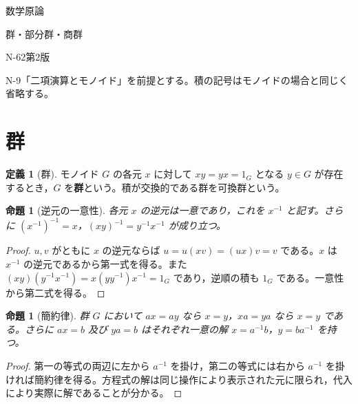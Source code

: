 \documentclass[a5paper,10pt,dvipdfmx]{jsarticle}
\theoremstyle{definition}
\newtheorem{defn}[ruledef]{定義}
\theoremstyle{plain}
\newtheorem{prop}[ruledef]{命題}
\begin{document}
\begin{center}
{\small 数学原論}\par\vspace{4mm}
{\LARGE 群・部分群・商群}\par\vspace{2mm}
{\small N-62\quad 第2版}
\end{center}
N-9「二項演算とモノイド」を前提とする。積の記号はモノイドの場合と同じく省略する。
\section{群}
\begin{defn}[群]\label{k225}
モノイド $G$ の各元 $x$ に対して $xy=yx=1_G$ となる $y\in G$ が存在するとき，$G$ を\textbf{群}という。積が交換的である群を可換群という。
\end{defn}
\begin{prop}[逆元の一意性]\label{k226}
各元 $x$ の逆元は一意であり，これを $x^{-1}$ と記す。さらに $(x^{-1})^{-1}=x$，$(xy)^{-1}=y^{-1}x^{-1}$ が成り立つ。
\end{prop}
\begin{proof}
$u,v$ がともに $x$ の逆元ならば $u=u(xv)=(ux)v=v$ である。$x$ は $x^{-1}$ の逆元であるから第一式を得る。また $(xy)(y^{-1}x^{-1})=x(yy^{-1})x^{-1}=1_G$ であり，逆順の積も $1_G$ である。一意性から第二式を得る。
\end{proof}
\begin{prop}[簡約律]\label{k227}
群 $G$ において $ax=ay$ なら $x=y$，$xa=ya$ なら $x=y$ である。さらに $ax=b$ 及び $ya=b$ はそれぞれ一意の解 $x=a^{-1}b$，$y=ba^{-1}$ を持つ。
\end{prop}
\begin{proof}
第一の等式の両辺に左から $a^{-1}$ を掛け，第二の等式には右から $a^{-1}$ を掛ければ簡約律を得る。方程式の解は同じ操作により表示された元に限られ，代入により実際に解であることが分かる。
\end{proof}
\end{document}
